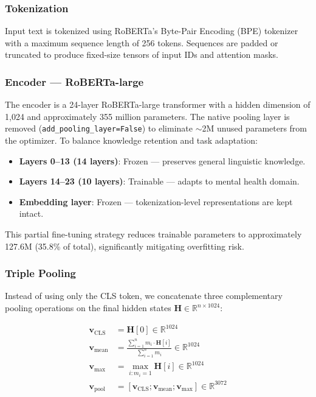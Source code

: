 \documentclass[conference, 10pt]{IEEEtran}
\begin{document}
\subsubsection{Tokenization}
Input text is tokenized using RoBERTa's Byte-Pair Encoding (BPE) tokenizer with a maximum sequence length of 256 tokens. Sequences are padded or truncated to produce fixed-size tensors of input IDs and attention masks.

\subsubsection{Encoder — RoBERTa-large}
The encoder is a 24-layer RoBERTa-large transformer with a hidden dimension of 1,024 and approximately 355 million parameters. The native pooling layer is removed (\texttt{add\_pooling\_layer=False}) to eliminate $\sim$2M unused parameters from the optimizer. To balance knowledge retention and task adaptation:

\begin{itemize}[noitemsep]
    \item \textbf{Layers 0--13 (14 layers)}: Frozen — preserves general linguistic knowledge.
    \item \textbf{Layers 14--23 (10 layers)}: Trainable — adapts to mental health domain.
    \item \textbf{Embedding layer}: Frozen — tokenization-level representations are kept intact.
\end{itemize}

This partial fine-tuning strategy reduces trainable parameters to approximately 127.6M (35.8\% of total), significantly mitigating overfitting risk.

\subsubsection{Triple Pooling}
Instead of using only the CLS token, we concatenate three complementary pooling operations on the final hidden states $\mathbf{H} \in \mathbb{R}^{n \times 1024}$:

\begin{align}
    \mathbf{v}_{\text{CLS}} &= \mathbf{H}[0] \in \mathbb{R}^{1024} \label{eq:cls} \\
    \mathbf{v}_{\text{mean}} &= \frac{\sum_{i=1}^{n} m_i \cdot \mathbf{H}[i]}{\sum_{i=1}^{n} m_i} \in \mathbb{R}^{1024} \label{eq:mean} \\
    \mathbf{v}_{\text{max}} &= \max_{i: m_i = 1} \mathbf{H}[i] \in \mathbb{R}^{1024} \label{eq:max} \\
    \mathbf{v}_{\text{pool}} &= [\mathbf{v}_{\text{CLS}}; \mathbf{v}_{\text{mean}}; \mathbf{v}_{\text{max}}] \in \mathbb{R}^{3072} \label{eq:concat}
\end{align}
\end{document}
